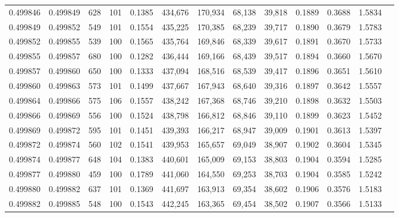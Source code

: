 \begin{tabular}{rrrrrrrrrrrrr}
0.499846 & 0.499849 &   628 & 101 &                                     0.1385 & 434,676 & 170,934 &  68,138 &  39,818 & 0.1889 & 0.3688 & 1.5834 \\
0.499849 & 0.499852 &   549 & 101 &                                     0.1554 & 435,225 & 170,385 &  68,239 &  39,717 & 0.1890 & 0.3679 & 1.5783 \\
0.499852 & 0.499855 &   539 & 100 &                                     0.1565 & 435,764 & 169,846 &  68,339 &  39,617 & 0.1891 & 0.3670 & 1.5733 \\
0.499855 & 0.499857 &   680 & 100 &                                     0.1282 & 436,444 & 169,166 &  68,439 &  39,517 & 0.1894 & 0.3660 & 1.5670 \\
0.499857 & 0.499860 &   650 & 100 &                                     0.1333 & 437,094 & 168,516 &  68,539 &  39,417 & 0.1896 & 0.3651 & 1.5610 \\
0.499860 & 0.499863 &   573 & 101 &                                     0.1499 & 437,667 & 167,943 &  68,640 &  39,316 & 0.1897 & 0.3642 & 1.5557 \\
0.499864 & 0.499866 &   575 & 106 &                                     0.1557 & 438,242 & 167,368 &  68,746 &  39,210 & 0.1898 & 0.3632 & 1.5503 \\
0.499866 & 0.499869 &   556 & 100 &                                     0.1524 & 438,798 & 166,812 &  68,846 &  39,110 & 0.1899 & 0.3623 & 1.5452 \\
0.499869 & 0.499872 &   595 & 101 &                                     0.1451 & 439,393 & 166,217 &  68,947 &  39,009 & 0.1901 & 0.3613 & 1.5397 \\
0.499872 & 0.499874 &   560 & 102 &                                     0.1541 & 439,953 & 165,657 &  69,049 &  38,907 & 0.1902 & 0.3604 & 1.5345 \\
0.499874 & 0.499877 &   648 & 104 &                                     0.1383 & 440,601 & 165,009 &  69,153 &  38,803 & 0.1904 & 0.3594 & 1.5285 \\
0.499877 & 0.499880 &   459 & 100 &                                     0.1789 & 441,060 & 164,550 &  69,253 &  38,703 & 0.1904 & 0.3585 & 1.5242 \\
0.499880 & 0.499882 &   637 & 101 &                                     0.1369 & 441,697 & 163,913 &  69,354 &  38,602 & 0.1906 & 0.3576 & 1.5183 \\
0.499882 & 0.499885 &   548 & 100 &                                     0.1543 & 442,245 & 163,365 &  69,454 &  38,502 & 0.1907 & 0.3566 & 1.5133 \\

\end{tabular}
